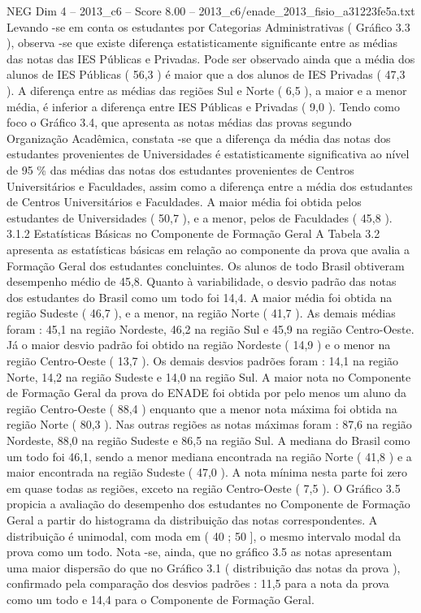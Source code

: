 \begin{textsample}{NEG Dim 4 – 2013\_c6 – Score 8.00 – 2013\_c6/enade\_2013\_fisio\_a31223fe5a.txt}
Levando -se em conta os estudantes por Categorias Administrativas ( Gráfico 3.3 ), observa -se que existe diferença estatisticamente significante entre as médias das notas das IES Públicas e Privadas.
Pode ser observado ainda que a média dos alunos de IES Públicas ( 56,3 ) é maior que a dos alunos de IES Privadas ( 47,3 ).
A diferença entre as médias das regiões Sul e Norte ( 6,5 ), a maior e a menor média, é inferior a diferença entre IES Públicas e Privadas ( 9,0 ).
Tendo como foco o Gráfico 3.4, que apresenta as notas médias das provas segundo Organização Acadêmica, constata -se que a diferença da média das notas dos estudantes provenientes de Universidades é estatisticamente significativa ao nível de 95 \% das médias das notas dos estudantes provenientes de Centros Universitários e Faculdades, assim como a diferença entre a média dos estudantes de Centros Universitários e Faculdades.
A maior média foi obtida pelos estudantes de Universidades ( 50,7 ), e a menor, pelos de Faculdades ( 45,8 ). 3.1.2 Estatísticas Básicas no Componente de Formação Geral A Tabela 3.2 apresenta as estatísticas básicas em relação ao componente da prova que avalia a Formação Geral dos estudantes concluintes.
Os alunos de todo Brasil obtiveram desempenho médio de 45,8.
Quanto à variabilidade, o desvio padrão das notas dos estudantes do Brasil como um todo foi 14,4.
A maior média foi obtida na região Sudeste ( 46,7 ), e a menor, na região Norte ( 41,7 ).
As demais médias foram : 45,1 na região Nordeste, 46,2 na região Sul e 45,9 na região Centro-Oeste.
Já o maior desvio padrão foi obtido na região Nordeste ( 14,9 ) e o menor na região Centro-Oeste ( 13,7 ).
Os demais desvios padrões foram : 14,1 na região Norte, 14,2 na região Sudeste e 14,0 na região Sul.
A maior nota no Componente de Formação Geral da prova do ENADE foi obtida por pelo menos um aluno da região Centro-Oeste ( 88,4 ) enquanto que a menor nota máxima foi obtida na região Norte ( 80,3 ).
Nas outras regiões as notas máximas foram : 87,6 na região Nordeste, 88,0 na região Sudeste e 86,5 na região Sul.
A mediana do Brasil como um todo foi 46,1, sendo a menor mediana encontrada na região Norte ( 41,8 ) e a maior encontrada na região Sudeste ( 47,0 ).
A nota mínima nesta parte foi zero em quase todas as regiões, exceto na região Centro-Oeste ( 7,5 ).
O Gráfico 3.5 propicia a avaliação do desempenho dos estudantes no Componente de Formação Geral a partir do histograma da distribuição das notas correspondentes.
A distribuição é unimodal, com moda em ( 40 ; 50 ], o mesmo intervalo modal da prova como um todo.
Nota -se, ainda, que no gráfico 3.5 as notas apresentam uma maior dispersão do que no Gráfico 3.1 ( distribuição das notas da prova ), confirmado pela comparação dos desvios padrões : 11,5 para a nota da prova como um todo e 14,4 para o Componente de Formação Geral.

\end{textsample}
